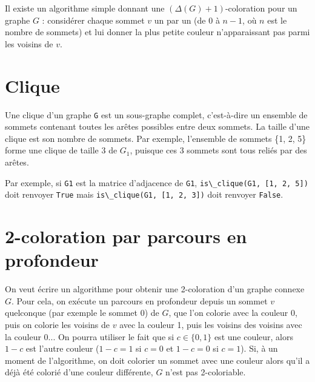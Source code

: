 
Il existe un algorithme simple donnant une $(\Delta(G) + 1)$-coloration pour un graphe $G$ : considérer chaque sommet $v$ un par un
(de 0 à $n - 1$, où $n$ est le nombre de sommets) et lui donner la plus petite couleur n’apparaissant pas parmi les voisins de $v$.


\section{Clique}
Une clique d’un graphe \lstinline{G} est un sous-graphe complet, c’est-à-dire un ensemble de sommets contenant toutes les arêtes possibles
entre deux sommets. La taille d’une clique est son nombre de sommets.
Par exemple, l’ensemble de sommets \{1, 2, 5\} forme une clique de taille 3 de $G_1$, puisque ces 3 sommets sont tous reliés par des
arêtes.



Par exemple, si \lstinline{G1} est la matrice d’adjacence de \lstinline{G1}, \lstinline{is\_clique(G1, [1, 2, 5])} doit renvoyer \lstinline{True} mais \lstinline{is\_clique(G1, [1, 2, 3])} doit renvoyer \lstinline{False}.

\section{2-coloration par parcours en profondeur}
On veut écrire un algorithme pour obtenir une 2-coloration d’un graphe connexe $G$. Pour cela, on exécute un parcours en
profondeur depuis un sommet $v$ quelconque (par exemple le sommet 0) de $G$, que l’on colorie avec la couleur 0, puis on colorie
les voisins de $v$ avec la couleur 1, puis les voisins des voisins avec la couleur 0...
On pourra utiliser le fait que si $c\in\{0, 1\}$ est une couleur, alors $1- c$ est l’autre couleur ($1 -c = 1$ si $c = 0$ et $1 - c = 0$ si $c = 1$).
Si, à un moment de l’algorithme, on doit colorier un sommet avec une couleur alors qu’il a déjà été colorié d’une couleur différente,
$G$ n’est pas 2-coloriable.


